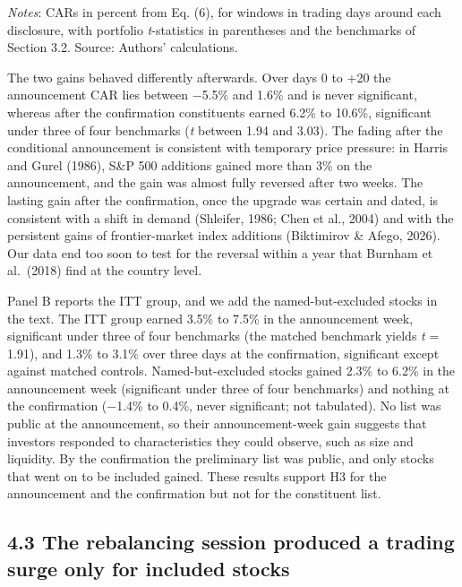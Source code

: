 \emph{Notes}: CARs in percent from Eq. (6), for windows in trading days
around each disclosure, with portfolio \emph{t}-statistics in
parentheses and the benchmarks of Section 3.2. Source: Authors'
calculations.

The two gains behaved differently afterwards. Over days 0 to +20 the
announcement CAR lies between −5.5\% and 1.6\% and is never significant,
whereas after the confirmation constituents earned 6.2\% to 10.6\%,
significant under three of four benchmarks (\emph{t} between 1.94 and
3.03). The fading after the conditional announcement is consistent with
temporary price pressure: in Harris and Gurel (1986), S\&P 500 additions
gained more than 3\% on the announcement, and the gain was almost fully
reversed after two weeks. The lasting gain after the confirmation, once
the upgrade was certain and dated, is consistent with a shift in demand
(Shleifer, 1986; Chen et al., 2004) and with the persistent gains of
frontier-market index additions (Biktimirov \& Afego, 2026). Our data
end too soon to test for the reversal within a year that Burnham et
al.~(2018) find at the country level.

Panel B reports the ITT group, and we add the named-but-excluded stocks
in the text. The ITT group earned 3.5\% to 7.5\% in the announcement
week, significant under three of four benchmarks (the matched benchmark
yields \emph{t} = 1.91), and 1.3\% to 3.1\% over three days at the
confirmation, significant except against matched controls.
Named-but-excluded stocks gained 2.3\% to 6.2\% in the announcement week
(significant under three of four benchmarks) and nothing at the
confirmation (−1.4\% to 0.4\%, never significant; not tabulated). No
list was public at the announcement, so their announcement-week gain
suggests that investors responded to characteristics they could observe,
such as size and liquidity. By the confirmation the preliminary list was
public, and only stocks that went on to be included gained. These
results support H3 for the announcement and the confirmation but not for
the constituent list.

\hypertarget{the-rebalancing-session-produced-a-trading-surge-only-for-included-stocks}{%
\subsection{4.3 The rebalancing session produced a trading surge only
for included
stocks}\label{the-rebalancing-session-produced-a-trading-surge-only-for-included-stocks}}

